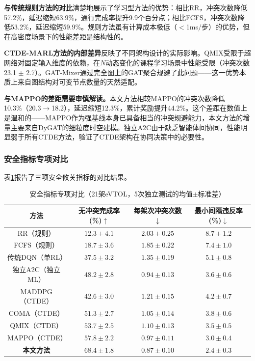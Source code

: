 \documentclass[12pt,a4paper,UTF8]{ctexart}
\begin{document}
\textbf{与传统规则方法的对比}清楚地展示了学习型方法的优势：相比RR，冲突次数降低57.2\%，延迟缩短63.9\%，通行完成率提升9.9个百分点；相比FCFS，冲突次数降低53.2\%，延迟缩短59.9\%。规则方法虽有计算成本极低（$<$1ms/步）的优势，但在高密度场景下的性能差距是结构性的。

\textbf{CTDE-MARL方法的内部差异}反映了不同架构设计的实际影响。QMIX受限于超网络对固定输入维度的依赖，在$N$动态变化的课程学习场景中性能受限（冲突次数23.1 $\pm$ 2.7）。GAT-Mixer通过完全图上的GAT聚合规避了此问题——这一优势本质上来自图结构对可变节点数量的天然适配。

\textbf{与MAPPO的差距需要审慎解读。}本文方法相较MAPPO的冲突次数降低10.3\%（20.3$\to$18.2），延迟缩短12.3\%，累计奖励提升44.2\%。这个差距在数值上是温和的——MAPPO作为强基线本身已具备相当的冲突规避能力，本文方法的增量主要来自DyGAT的细粒度时空建模。独立A2C由于缺乏智能体间协同，性能明显弱于所有CTDE方法，验证了CTDE架构在协同决策中的必要性。

\subsubsection{安全指标专项对比}

表\ref{tab:safety_metrics}报告了三项安全攸关指标的对比结果。

\begin{table}[H]
    \centering
    \caption{安全指标专项对比（21架eVTOL，5次独立测试的均值$\pm$标准差）}
    \label{tab:safety_metrics}
    \begin{tabular}{|c|c|c|c|}
        \hline
        \textbf{方法} & \textbf{无冲突完成率(\%)$\uparrow$} & \textbf{每架次冲突次数$\downarrow$} & \textbf{最小间隔违反率(\%)$\downarrow$} \\
        \hline
        RR（规则） & $12.3 \pm 4.1$ & $2.03 \pm 0.25$ & $8.7 \pm 1.2$ \\
        FCFS（规则） & $18.7 \pm 3.6$ & $1.85 \pm 0.22$ & $7.4 \pm 1.0$ \\
        传统DQN（单RL） & $37.5 \pm 3.2$ & $1.35 \pm 0.19$ & $5.1 \pm 0.8$ \\
        独立A2C（独立ML） & $48.2 \pm 2.8$ & $0.94 \pm 0.13$ & $3.6 \pm 0.6$ \\
        MADDPG（CTDE） & $42.6 \pm 3.0$ & $1.21 \pm 0.15$ & $4.2 \pm 0.7$ \\
        COMA（CTDE） & $51.3 \pm 2.7$ & $1.05 \pm 0.14$ & $3.8 \pm 0.6$ \\
        QMIX（CTDE） & $53.7 \pm 2.5$ & $1.10 \pm 0.13$ & $3.5 \pm 0.5$ \\
        MAPPO（CTDE） & $57.8 \pm 2.2$ & $0.97 \pm 0.11$ & $3.0 \pm 0.4$ \\
        \textbf{本文方法} & $\mathbf{68.4 \pm 1.8}$ & $\mathbf{0.87 \pm 0.10}$ & $\mathbf{2.4 \pm 0.3}$ \\
        \hline
    \end{tabular}
\end{table}
\end{document}
